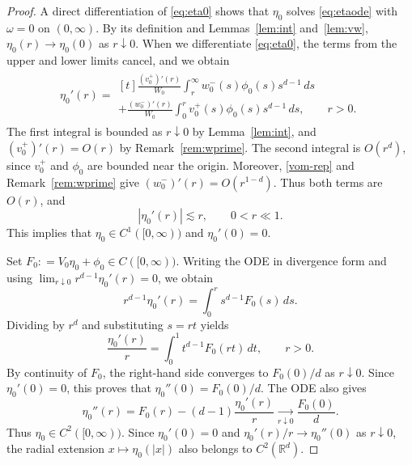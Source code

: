 \documentclass[12pt, a4paper, reqno]{amsart}
\numberwithin{equation}{section}
\theoremstyle{definition}
\theoremstyle{remark}
\newcommand{\R}{\mathbb R}
\newcommand{\ce}{\mathrel{\mathop:}=}
\begin{document}
\begin{proof}
A direct differentiation of \eqref{eq:eta0} shows that $\eta_0$ solves
\eqref{eq:etaode} with $\omega=0$ on $(0,\infty)$.
By its definition and Lemmas~\ref{lem:int} and~\ref{lem:vw},
$\eta_0(r)\to\eta_0(0)$ as $r\downarrow0$.
When we differentiate \eqref{eq:eta0}, the terms from the upper and
lower limits cancel, and we obtain
\begin{align}
\label{eta0prim}
  \eta_0'(r)
  ={}
\begin{multlined}[t]  
  \frac{(v_0^+)'(r)}{W_0}
       \int_r^\infty w_0^-(s)\phi_0(s)s^{d-1}\,ds
    \\  +\frac{(w_0^-)'(r)}{W_0}
       \int_0^r v_0^+(s)\phi_0(s)s^{d-1}\,ds,\qquad r>0.
 \end{multlined}      
\end{align}
The first integral is bounded as $r\downarrow0$ by
Lemma~\ref{lem:int}, and $(v_0^+)'(r)=O(r)$ by
Remark~\ref{rem:wprime}. The second integral is $O(r^d)$, since
$v_0^+$ and $\phi_0$ are bounded near the origin. Moreover,
\eqref{vom-rep} and Remark~\ref{rem:wprime} give
$(w_0^-)'(r)=O(r^{1-d})$. Thus both terms
are $O(r)$, and
\[
  |\eta_0'(r)|\lesssim r,\qquad 0<r\ll1.
\]
This implies that $\eta_0\in C^1([0,\infty))$ and $\eta_0'(0)=0$.

Set $F_0\ce V_0\eta_0+\phi_0\in C([0,\infty))$. Writing the ODE in
divergence form and using
$\lim_{r\downarrow0}r^{d-1}\eta_0'(r)=0$, we obtain
\[
  r^{d-1}\eta_0'(r)=\int_0^r s^{d-1}F_0(s)\,ds.
\]
Dividing by $r^d$ and substituting $s=rt$ yields
\begin{equation}\label{eq:etaratio}
  \frac{\eta_0'(r)}r
  =\int_0^1 t^{d-1}F_0(rt)\,dt,\qquad r>0.
\end{equation}
By continuity of $F_0$, the right-hand side converges to $F_0(0)/d$
as $r\downarrow0$. Since $\eta_0'(0)=0$, this proves that
$\eta_0''(0)=F_0(0)/d$. The ODE also gives
\[
  \eta_0''(r)
  =F_0(r)-(d-1)\frac{\eta_0'(r)}r
 \xrightarrow[r\downarrow0]{}  \frac{F_0(0)}d.
\]
Thus $\eta_0\in C^2([0,\infty))$.
Since $\eta_0'(0)=0$ and $\eta_0'(r)/r\to\eta_0''(0)$ as
$r\downarrow0$, the radial extension $x\mapsto\eta_0(|x|)$ also
belongs to $C^2(\R^d)$.


\end{proof}
\end{document}

